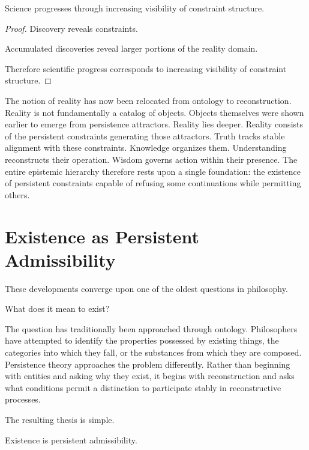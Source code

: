 \documentclass[12pt,oneside]{article}
\theoremstyle{definition}
\begin{document}
\begin{corollary}

Science progresses through increasing visibility of constraint structure.

\end{corollary}

\begin{proof}

Discovery reveals constraints.

Accumulated discoveries reveal larger portions of the reality domain.

Therefore scientific progress corresponds to increasing visibility of constraint structure.

\end{proof}

The notion of reality has now been relocated from ontology to reconstruction. Reality is not fundamentally a catalog of objects. Objects themselves were shown earlier to emerge from persistence attractors. Reality lies deeper. Reality consists of the persistent constraints generating those attractors. Truth tracks stable alignment with these constraints. Knowledge organizes them. Understanding reconstructs their operation. Wisdom governs action within their presence. The entire epistemic hierarchy therefore rests upon a single foundation: the existence of persistent constraints capable of refusing some continuations while permitting others.

\section{Existence as Persistent Admissibility}

These developments converge upon one of the oldest questions in philosophy.

What does it mean to exist?

The question has traditionally been approached through ontology. Philosophers have attempted to identify the properties possessed by existing things, the categories into which they fall, or the substances from which they are composed. Persistence theory approaches the problem differently. Rather than beginning with entities and asking why they exist, it begins with reconstruction and asks what conditions permit a distinction to participate stably in reconstructive processes.

The resulting thesis is simple.

Existence is persistent admissibility.
\end{document}
